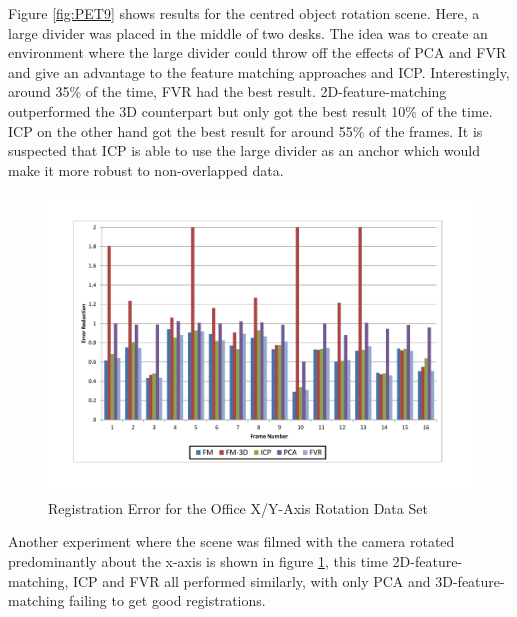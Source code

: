 Figure \ref{fig:PET9} shows results for the centred object rotation scene. Here, a large divider was placed in the middle of two desks. The idea was to create an environment where the large divider could throw off the effects of PCA and FVR and give an advantage to the feature matching approaches and ICP. Interestingly, around 35\% of the time, FVR had the best result. 2D-feature-matching outperformed the 3D counterpart but only got the best result 10\% of the time. ICP on the other hand got the best result for around 55\% of the frames. It is suspected that ICP is able to use the large divider as an anchor which would make it more robust to non-overlapped data.

\begin{figure}[t]
\centering
\includegraphics[width=6.0in]{images/results/Office_Texture_Rotate_XAxis}
\caption{Registration Error for the Office X/Y-Axis Rotation Data Set}
\label{fig:PET10}
\end{figure}

Another experiment where the scene was filmed with the camera rotated predominantly about the x-axis is shown in figure \ref{fig:PET10}, this time 2D-feature-matching, ICP and FVR all performed similarly, with only PCA and 3D-feature-matching failing to get good registrations. 

